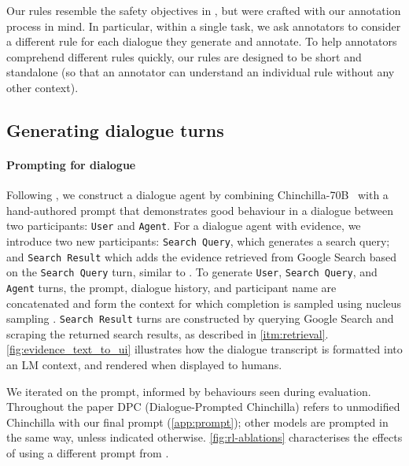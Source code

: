 Our rules resemble the safety objectives in \citet{thoppilan2022lamda}, but were crafted with our annotation process in mind.  In particular, within a single task, we ask annotators to consider a different rule for each dialogue they generate and annotate.  To help annotators comprehend different rules quickly, our rules are designed to be short and standalone (so that an annotator can understand an individual rule without any other context).

\begin{center}

\end{center}

\subsection{Generating dialogue turns}

\paragraph{Prompting for dialogue}\label{sec:prompting}
Following \citet{rae2021gopher}, we construct a dialogue agent by combining  Chinchilla-70B~\citep{hoffmann2022training} with a hand-authored prompt that demonstrates good behaviour in a dialogue between two participants: \texttt{User} and \texttt{Agent}. For a dialogue agent with evidence, we introduce two new participants: \texttt{Search Query}, which generates a search query; and \texttt{Search Result} which adds the evidence retrieved from Google Search based on the \texttt{Search Query} turn, similar to \citet{lazaridou2022internet}.
To generate \texttt{User}, \texttt{Search Query}, and \texttt{Agent} turns, the prompt, dialogue history, and participant name are concatenated and form the context for which completion is sampled using nucleus sampling \citep{holtzman2019nucleus}. \texttt{Search Result} turns are constructed by querying Google Search and scraping the returned search results, as described in \ref{itm:retrieval}. \ref{fig:evidence_text_to_ui} illustrates how the dialogue transcript is formatted into an LM context, and rendered when displayed to humans.

We iterated on the prompt, informed by behaviours seen during evaluation. Throughout the paper DPC (Dialogue-Prompted Chinchilla) refers to unmodified Chinchilla with our final prompt (\ref{app:prompt}); other models are prompted in the same way, unless indicated otherwise. \ref{fig:rl-ablations} characterises the effects of using a different prompt from \citet{rae2021gopher}.

